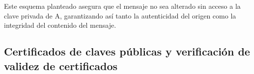 Este esquema planteado asegura que el mensaje no sea alterado sin acceso a la clave privada de A, garantizando así tanto la autenticidad del origen como la integridad del contenido del mensaje.

\subsection{Certificados de claves públicas y verificación de validez de certificados}






